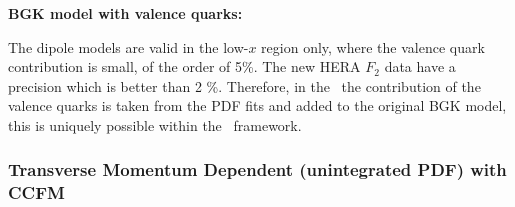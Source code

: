 \begin{description}
\vspace{0.1cm}
\item \bf {BGK model with valence quarks:} \rm

The dipole models are valid in the low-$x$ region only, where the valence quark contribution is small, of the order of 5\%. The new HERA $F_2$ data have a precision which is  better than 2 \%. Therefore, in the \fitter\ the contribution of the valence quarks is taken from the PDF fits and added to the original 
BGK model, this is uniquely possible within the \fitter\ framework.
\end{description}

\subsubsection{Transverse Momentum Dependent (unintegrated PDF) with CCFM}

